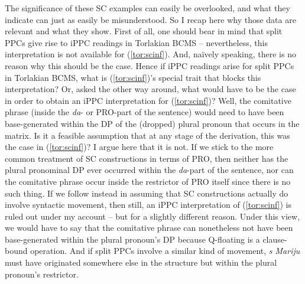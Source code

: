 \documentclass[output=paper,colorlinks,citecolor=brown]{langscibook}
\begin{document}
The significance of these SC examples can easily be overlooked, and what they indicate can just as easily be misunderstood. So I recap here why those data are relevant and what they show. First of all, one should bear in mind that split PPCs give rise to iPPC readings in Torlakian BCMS -- nevertheless, this interpretation is not available for (\ref{tor:scinf}). And, na\"{i}vely speaking, there is no reason why this should be the case. Hence if iPPC readings arise for split PPCs in Torlakian BCMS, what is (\ref{tor:scinf})'s special trait that blocks this interpretation? Or, asked the other way around, what would have to be the case in order to obtain an iPPC interpretation for (\ref{tor:scinf})? Well, the comitative phrase (inside the \textit{da}- or PRO-part of the sentence) would need to have been base-generated within the DP of the (dropped) plural pronoun that occurs in the matrix. Is it a feasible assumption that at any stage of the derivation, this was the case in (\ref{tor:scinf})? I argue here that it is not. If we stick to the more common treatment of SC constructions in terms of PRO, then neither has the plural pronominal DP ever occurred within the \textit{da}-part of the sentence, nor can the comitative phrase occur inside the restrictor of PRO itself since there is no such thing. If we follow \citet{Hornstein1999} instead in assuming that SC constructions actually do involve syntactic movement, then still, an iPPC interpretation of (\ref{tor:scinf}) is ruled out under my account -- but for a slightly different reason. Under this view, we would have to say that the comitative phrase can nonetheless not have been base-generated within the plural pronoun's DP because Q-floating is a clause-bound operation. And if split PPCs involve a similar kind of movement, \textit{s Mariju} must have originated somewhere else in the structure but within the plural pronoun's restrictor.
\end{document}
